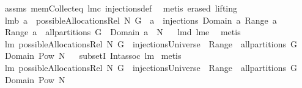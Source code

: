 \begin{isabellebody}
%
\isadelimproof
%
\endisadelimproof
%
\isatagproof
{}\isamarkupfalse%
\ assms\ mem{\isacharunderscore}Collect{\isacharunderscore}eq\ lm{}{}c\ injections{\isacharunderscore}def\ \isamarkupfalse%
\ {\isacharparenleft}metis\ {\isacharparenleft}erased{\isacharcomma}\ lifting{\isacharparenright}{\isacharparenright}%
\endisatagproof
{\isafoldproof}%
%
\isadelimproof
\isanewline
%
\endisadelimproof
\isanewline
{}\isamarkupfalse%
\ lm{}{}b{\isacharcolon}\ {\isachardoublequoteopen}a\ {\isasymin}\ possibleAllocationsRel\ N\ G\ {\isacharequal}\ {\isacharparenleft}a\ {\isasymin}\ injections\ {\isacharparenleft}Domain\ a{\isacharparenright}\ {\isacharparenleft}Range\ a{\isacharparenright}\ \isanewline
{\isacharampersand}\ Range\ a\ {\isasymin}\ all{\isacharunderscore}partitions\ G\ {\isacharampersand}\ Domain\ a\ {\isasymsubseteq}\ N{\isacharparenright}{\isachardoublequoteclose}%
\isadelimproof
\ %
\endisadelimproof
%
\isatagproof
{}\isamarkupfalse%
\ lm{}{}d\ lm{}{}e\ \isamarkupfalse%
\ metis%
\endisatagproof
{\isafoldproof}%
%
\isadelimproof
%
\endisadelimproof
\isanewline
\isanewline
{}\isamarkupfalse%
\ lm{}{}{\isacharcolon}\ {\isachardoublequoteopen}possibleAllocationsRel\ N\ G\ {\isasymsupseteq}\ injectionsUniverse\ {\isasyminter}\ {\isacharparenleft}Range\ {\isacharminus}{\isacharbackquote}\ {\isacharparenleft}all{\isacharunderscore}partitions\ G{\isacharparenright}{\isacharparenright}\isanewline
{\isasyminter}\ {\isacharparenleft}Domain\ {\isacharminus}{\isacharbackquote}{\isacharparenleft}Pow\ N{\isacharparenright}{\isacharparenright}{\isachardoublequoteclose}%
\isadelimproof
\ %
\endisadelimproof
%
\isatagproof
{}\isamarkupfalse%
\ subsetI\ Int{\isacharunderscore}assoc\ lm{}{}\isanewline
{}\isamarkupfalse%
\ metis%
\endisatagproof
{\isafoldproof}%
%
\isadelimproof
%
\endisadelimproof
\ \isanewline
\isanewline
{}\isamarkupfalse%
\ lm{}{}{\isacharcolon}\ {\isachardoublequoteopen}possibleAllocationsRel\ N\ G\ {\isacharequal}\ injectionsUniverse\ {\isasyminter}\ {\isacharparenleft}Range\ {\isacharminus}{\isacharbackquote}\ {\isacharparenleft}all{\isacharunderscore}partitions\ G{\isacharparenright}{\isacharparenright}\isanewline
{\isasyminter}\ {\isacharparenleft}Domain\ {\isacharminus}{\isacharbackquote}{\isacharparenleft}Pow\ N{\isacharparenright}{\isacharparenright}{\isachardoublequoteclose}%

\end{isabellebody}
